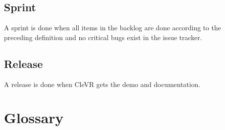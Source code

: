 \documentclass[11pt]{article}
\begin{document}
	\subsection{Sprint}
	A sprint is done when all items in the backlog are done according to the preceding definition and no critical bugs exist in the issue tracker.

	\subsection{Release}
	A release is done when \gls{CleVR} gets the demo and documentation.

\section{Glossary}
\printglossary[title=]
\end{document}
